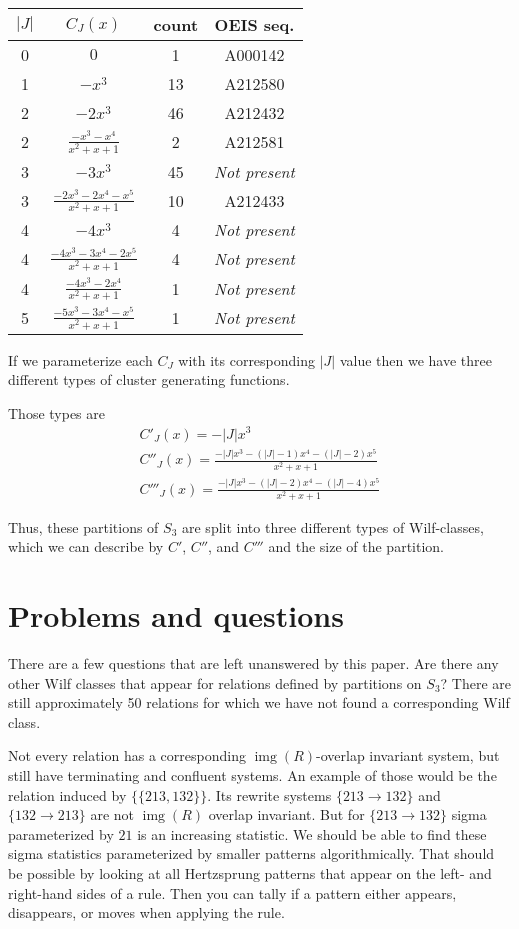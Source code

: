 \documentclass[a4paper, 11pt, english]{article}
\newcommand{\patternrule}{ \to \!}
\theoremstyle{definition}
\newcommand{\Sym}{S}
\DeclareMathOperator{\img}{img}
\begin{document}
\begin{center}
\begin{tabular}{c|c|c|c}
    $|J|$ & $C_J(x)$ & count & OEIS seq. \\
    \hline
    0 & $0$ & 1 & A000142 \\
    1 & $-x^3$ & 13 & A212580 \\
    2 & $-2x^3$ & 46 & A212432 \\
    2 & $\frac{-x^3-x^4}{x^2+x+1}$ & 2 & A212581 \\
    3 & $-3x^3$ & 45 & \emph{Not present} \\
    3 & $\frac{-2x^3-2x^4-x^5}{x^2+x+1}$ & 10 & A212433 \\
    4 & $-4x^3$ & 4 & \emph{Not present} \\
    4 & $\frac{-4x^3-3x^4-2x^5}{x^2+x+1}$ & 4 & \emph{Not present}\\
    4 & $\frac{-4x^3-2x^4}{x^2+x+1}$ & 1 & \emph{Not present} \\ 
    \hline
    \hline
    5 & $\frac{-5x^3-3x^4-x^5}{x^2+x+1}$ & 1 & \emph{Not present} \\ 
\end{tabular}
\end{center}
If we parameterize each $C_J$ with its corresponding $|J|$ value then we have
three different types of cluster generating functions.

Those types are 
\begin{gather*}
  C'_J(x) = -|J|x^3 \\
  C''_J(x) = \frac{-|J|x^3-(|J|-1)x^4-(|J|-2)x^5}{x^2+x+1} \\
  C'''_J(x) = \frac{-|J|x^3-(|J|-2)x^4-(|J|-4)x^5}{x^2+x+1}
\end{gather*}

Thus, these partitions of $\Sym_3$ are split into three different types
of Wilf-classes, which we can describe by $C'$, $C''$, and $C'''$ and the size
of the partition.

\section{Problems and questions}
There are a few questions that are left unanswered by this paper.
Are there any other Wilf classes that appear for relations defined by partitions on $\Sym_3$? There are
still approximately 50 relations for which we have not found a corresponding Wilf class. 

Not every relation has a corresponding $\img(R)$-overlap invariant system, but still have terminating and
confluent systems. An example of those would be the relation induced by $\{ \{ 213, 132
\} \}$. Its rewrite systems ${\{ 213 \patternrule 132 \}}$ and ${\{
132 \patternrule 213 \}}$ are not $\img(R)$ overlap invariant. 
But for $\{ 213 \patternrule 132 \}$ sigma parameterized by $21$ is an increasing statistic. We
should be able to find these sigma statistics parameterized by smaller patterns algorithmically.
That should be possible by looking at all Hertzsprung patterns that appear on the left- and right-hand
sides of a rule. Then you can tally if a pattern either appears, disappears, or moves when applying the rule.
\end{document}
